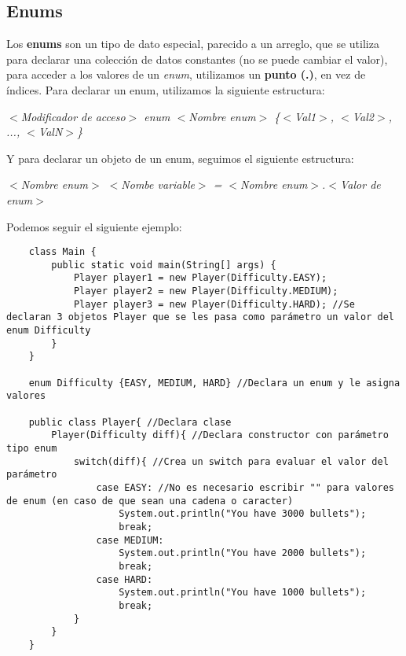 \subsection{Enums}
Los \textbf{enums} son un tipo de dato especial, parecido a un arreglo, que se utiliza para declarar una colección de datos constantes (no se puede cambiar el valor), para acceder a los valores de un \textit{enum}, utilizamos un \textbf{punto (.)}, en vez de índices. Para declarar un enum, utilizamos la siguiente estructura:\begin{center}\textit{$<$Modificador de acceso$>$ enum $<$Nombre enum$>$ \{$<$Val1$>$, $<$Val2$>$, ..., $<$ValN$>$\}}\end{center}
Y para declarar un objeto de un enum, seguimos el siguiente estructura:\begin{center}\textit{$<$Nombre enum$>$ $<$Nombe variable$>$ = $<$Nombre enum$>$.$<$Valor de enum$>$}\end{center}
Podemos seguir el siguiente ejemplo:
\begin{lstlisting}
    class Main {
        public static void main(String[] args) {
            Player player1 = new Player(Difficulty.EASY);
            Player player2 = new Player(Difficulty.MEDIUM);
            Player player3 = new Player(Difficulty.HARD); //Se declaran 3 objetos Player que se les pasa como parámetro un valor del enum Difficulty
        }
    }

    enum Difficulty {EASY, MEDIUM, HARD} //Declara un enum y le asigna valores

    public class Player{ //Declara clase
        Player(Difficulty diff){ //Declara constructor con parámetro tipo enum
            switch(diff){ //Crea un switch para evaluar el valor del parámetro
                case EASY: //No es necesario escribir "" para valores de enum (en caso de que sean una cadena o caracter)
                    System.out.println("You have 3000 bullets");
                    break;
                case MEDIUM:
                    System.out.println("You have 2000 bullets");
                    break;
                case HARD:
                    System.out.println("You have 1000 bullets");
                    break;
            }
        }
    }
\end{lstlisting}



